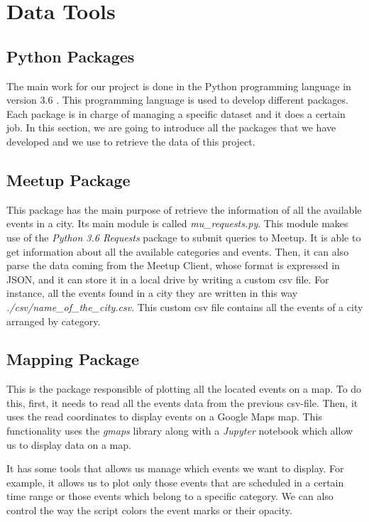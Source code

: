 \section{Data Tools}\label{sec:toolsanddata}
\subsection{Python Packages} 
The main work for our project is done in the Python programming language in version 3.6 \cite{python}. This programming language is used to develop different packages. Each package is in charge of managing a specific dataset and it does a certain job. In this section, we are going to introduce all the packages that we have developed and we use to retrieve the data of this project.

\subsection{Meetup Package}
This package has the main purpose of retrieve the information of all the available events in a city. Its main module is called \textit{mu\_requests.py}. This module makes use of the \textit{Python 3.6 Requests} package to submit queries to Meetup. It is able to get information about all the available categories and events. Then, it can also parse the data coming from the Meetup Client, whose format is expressed in JSON, and it can store it in a local drive by writing a custom csv file. For instance, all the events found in a city they are written in this way \textit{./csv/name\_of\_the\_city.csv}. This custom csv file contains all the events of a city arranged by category.

\subsection{Mapping Package}
This is the package responsible of plotting all the located events on a map. To do this, first, it needs to read all the events data from the previous csv-file. Then, it uses the read coordinates to display events on a Google Maps map. This functionality uses the \textit{gmaps} library along with a \textit{Jupyter} notebook which allow us to display data on a map.

It has some tools that allows us manage which events we want to display. For example, it allows us to plot only those events that are scheduled in a certain time range or those events which belong to a specific category. We can also control the way the script colors the event marks or their opacity.

